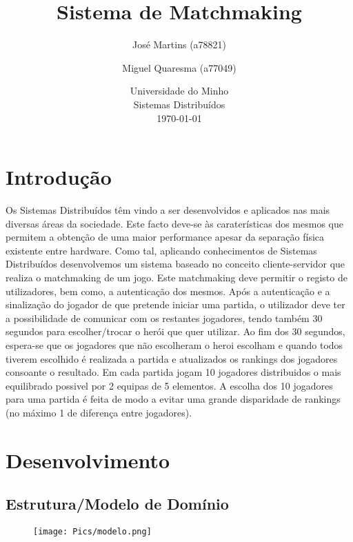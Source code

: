 \documentclass{article}
\begin{document}
\title{\vspace*{\fill}Sistema de Matchmaking}
\author{José Martins (a78821) \and Miguel Quaresma (a77049)}
\date{%
    Universidade do Minho\\
    Sistemas Distribuídos\\[2ex]%
    \today\vspace*{\fill}
}
\maketitle

\newpage

\tableofcontents

\newpage

\section{Introdução}
Os Sistemas Distribuídos têm vindo a ser desenvolvidos e aplicados nas mais diversas áreas da sociedade. Este facto deve-se às caraterísticas dos mesmos que permitem a obtenção
de uma maior performance apesar da separação física existente entre hardware. Como tal, aplicando conhecimentos de Sistemas Distribuídos desenvolvemos um sistema baseado no conceito cliente-servidor que realiza o matchmaking de um jogo. Este matchmaking deve permitir o registo de utilizadores, bem como, a autenticação dos mesmos. Após a autenticação e a sinalização do jogador de que pretende iniciar uma partida, o utilizador deve ter a possibilidade de comunicar com os restantes jogadores, tendo também 30 segundos para escolher/trocar o herói que quer utilizar. Ao fim dos 30 segundos, espera-se que os jogadores que não escolheram o heroi escolham e quando todos tiverem escolhido é realizada a partida e atualizados os rankings dos jogadores consoante o resultado. Em cada partida jogam 10 jogadores distribuidos o mais equilibrado possivel por 2 equipas de 5 elementos. A escolha dos 10 jogadores para uma partida é feita de modo a evitar uma grande disparidade de rankings (no máximo 1 de diferença entre jogadores).

\newpage

\section{Desenvolvimento}
\subsection{Estrutura/Modelo de Domínio}
\begin{figure}[ht!]
\centering 
\texttt{[image: Pics/modelo.png]}
\end{figure}
\end{document}
